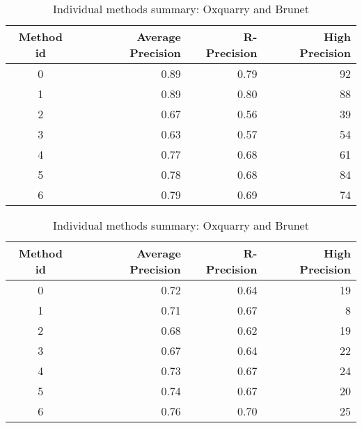 \begin{table}[H]
  \centering
  \caption{Individual methods summary: Oxquarry and Brunet}
  \label{tab:rls_oxquarry_brunet}

  \begin{tabular}{c r r r}
    \toprule
    Method id &
    Average Precision &
    R-Precision &
    High Precision \\
    \midrule
    0 & 0.89 & 0.79 & 92 \\
    1 & 0.89 & 0.80 & 88 \\
    2 & 0.67 & 0.56 & 39 \\
    3 & 0.63 & 0.57 & 54 \\
    4 & 0.77 & 0.68 & 61 \\
    5 & 0.78 & 0.68 & 84 \\
    6 & 0.79 & 0.69 & 74 \\
    \bottomrule
  \end{tabular}

  \vspace{0.5cm}

  \begin{tabular}{c r r r}
    \toprule
    Method id &
    Average Precision &
    R-Precision &
    High Precision \\
    \midrule
    0 & 0.72 & 0.64 & 19 \\
    1 & 0.71 & 0.67 &  8 \\
    2 & 0.68 & 0.62 & 19 \\
    3 & 0.67 & 0.64 & 22 \\
    4 & 0.73 & 0.67 & 24 \\
    5 & 0.74 & 0.67 & 20 \\
    6 & 0.76 & 0.70 & 25 \\
    \bottomrule
  \end{tabular}
\end{table}


